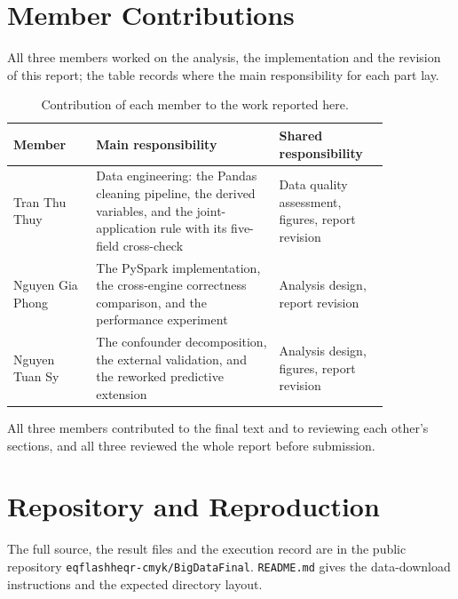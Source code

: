 \documentclass[sigconf,balance=false]{acmart}
\begin{document}
\FloatBarrier

\section{Member Contributions}

All three members worked on the analysis, the implementation and the
revision of this report; the table records where the main responsibility for
each part lay.

\begin{table}[t]
\caption{Contribution of each member to the work reported here.}
\label{tab:contrib}
\centering
\footnotesize
\begin{tabular}{@{}p{0.19\linewidth}p{0.42\linewidth}p{0.23\linewidth}@{}}
\toprule
Member & Main responsibility & Shared responsibility \\
\midrule
Tran Thu Thuy
& Data engineering: the Pandas cleaning pipeline, the derived variables, and the joint-application rule with its five-field cross-check
& Data quality assessment, figures, report revision \\
Nguyen Gia Phong
& The PySpark implementation, the cross-engine correctness comparison, and the performance experiment
& Analysis design, report revision \\
Nguyen Tuan Sy
& The confounder decomposition, the external validation, and the reworked predictive extension
& Analysis design, figures, report revision \\
\bottomrule
\end{tabular}
\end{table}

All three members contributed to the final text and to reviewing each
other's sections, and all three reviewed the whole report before submission.

\FloatBarrier

\section{Repository and Reproduction}

The full source, the result files and the execution record are in the public
repository \texttt{eqflashheqr-cmyk/BigDataFinal}. \texttt{README.md} gives
the data-download instructions and the expected directory layout.
\end{document}
